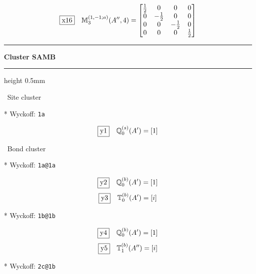 \documentclass[fleqn,10pt,landscape]{jsarticle}
\begin{document}
\begin{dmath*}
\fbox{x16}\quad \mathbb{M}_{3}^{(1,-1;a)}(A^{\prime\prime},4)=\begin{bmatrix} \frac{1}{2} & 0 & 0 & 0 \\ 0 & - \frac{1}{2} & 0 & 0 \\ 0 & 0 & - \frac{1}{2} & 0 \\ 0 & 0 & 0 & \frac{1}{2} \end{bmatrix}
\end{dmath*}
\vspace{5mm}
\noindent \rule[0.5mm]{5mm}{0.5mm}\hspace{3mm}\textbf{Cluster SAMB}\hspace{3mm}\leaders\hrule height 0.5mm\hfill\kern0pt
\vspace{3mm}

\noindent\textbullet\, Site cluster

\vspace{5mm}

\noindent ** Wyckoff: \texttt{1a}

\begin{dmath*}
\fbox{y1}\quad \mathbb{Q}_{0}^{(s)}(A^{\prime})=\left[ 1 \right]
\end{dmath*}
\vspace{5mm}

\noindent\textbullet\, Bond cluster

\vspace{5mm}

\noindent ** Wyckoff: \texttt{1a@1a}

\begin{dmath*}
\fbox{y2}\quad \mathbb{Q}_{0}^{(b)}(A^{\prime})=\left[ 1 \right]
\end{dmath*}
\begin{dmath*}
\fbox{y3}\quad \mathbb{T}_{0}^{(b)}(A^{\prime})=\left[ i \right]
\end{dmath*}
\vspace{5mm}

\noindent ** Wyckoff: \texttt{1b@1b}

\begin{dmath*}
\fbox{y4}\quad \mathbb{Q}_{0}^{(b)}(A^{\prime})=\left[ 1 \right]
\end{dmath*}
\begin{dmath*}
\fbox{y5}\quad \mathbb{T}_{1}^{(b)}(A^{\prime\prime})=\left[ i \right]
\end{dmath*}
\vspace{5mm}

\noindent ** Wyckoff: \texttt{2c@1b}
\end{document}
